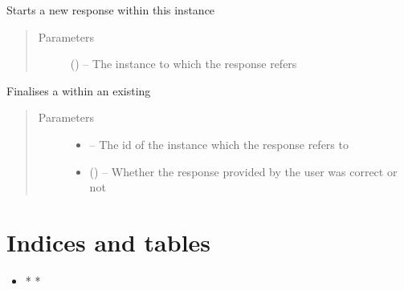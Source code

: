 \documentclass[letterpaper,10pt,english]{sphinxmanual}
\begin{document}
\begin{fulllineitems}

\begin{fulllineitems}
\label{\detokenize{user:user.User.start_response}}
Starts a new response within this instance
\begin{quote}\begin{description}
\item[{Parameters}] \leavevmode
{} ({\hyperref[\detokenize{instance:instance.Instance}]{}}) -- The instance to which the response refers

\end{description}\end{quote}

\end{fulllineitems}


\begin{fulllineitems}
\label{\detokenize{user:user.User.validate}}
Finalises a  within an existing 
\begin{quote}\begin{description}
\item[{Parameters}] \leavevmode\begin{itemize}
\item {} 
 -- The id of the instance which the response refers to

\item {} 
 () -- Whether the response provided by the user was correct or not

\end{itemize}

\end{description}\end{quote}

\end{fulllineitems}


\end{fulllineitems}



\chapter{Indices and tables}
\label{\detokenize{index:indices-and-tables}}\begin{itemize}
\item {} 
* 
* 

\end{itemize}
\end{document}
